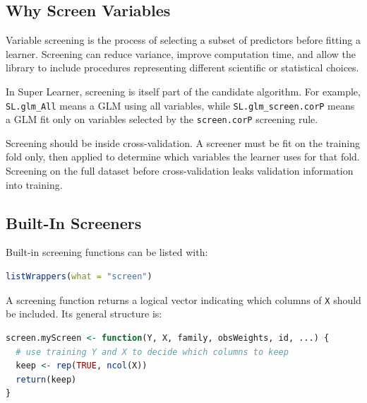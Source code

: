 \label{lec:6-6}

\subsection{Why Screen Variables}

Variable screening is the process of selecting a subset of predictors before fitting a
learner. Screening can reduce variance, improve computation time, and allow the
library to include procedures representing different scientific or statistical choices.

In Super Learner, screening is itself part of the candidate algorithm. For example,
\texttt{SL.glm\_All} means a GLM using all variables, while
\texttt{SL.glm\_screen.corP} means a GLM fit only on variables selected by the
\texttt{screen.corP} screening rule.

\begin{keyidea}
Screening should be inside cross-validation. A screener must be fit on the training
fold only, then applied to determine which variables the learner uses for that fold.
Screening on the full dataset before cross-validation leaks validation information into
training.
\end{keyidea}

\subsection{Built-In Screeners}

Built-in screening functions can be listed with:

\begin{implementationbox}
\begin{lstlisting}[language=R]
listWrappers(what = "screen")
\end{lstlisting}
\end{implementationbox}

A screening function returns a logical vector indicating which columns of \texttt{X}
should be included. Its general structure is:

\begin{implementationbox}
\begin{lstlisting}[language=R]
screen.myScreen <- function(Y, X, family, obsWeights, id, ...) {
  # use training Y and X to decide which columns to keep
  keep <- rep(TRUE, ncol(X))
  return(keep)
}
\end{lstlisting}
\end{implementationbox}

